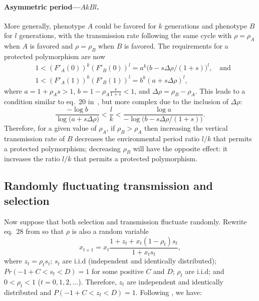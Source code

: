 \documentclass[14pt]{extarticle}
\begin{document}
\paragraph{Asymmetric period---$AkBl$.}
More generally, phenotype $A$ could be favored for $k$ generations and phenotype $B$ for $l$ generations, with the transmission rate following the same cycle with $\rho=\rho_A$ when $A$ is favored and $\rho=\rho_B$ when $B$ is favored.
The requirements for a protected polymorphism are now
\begin{equation}\begin{aligned}
& 1 < (F'_A(0))^k (F'_B(0))^l = a^k \big(b - s \Delta \rho /(1+s)\big)^l, \quad \text{and} \\
& 1 < (F'_A(1))^k (F'_B(1))^l = b^k (a + s \Delta \rho)^l,
\end{aligned}\end{equation}
where $a=1+\rho_A s>1$, $b=1-\rho_A\frac{s}{1+s}<1$, and $\Delta \rho = \rho_B - \rho_A$.
This leads to a condition similar to eq.~20 in~\citet{Ram2018}, but more complex due to the inclusion of $\Delta \rho$:
\begin{equation} \label{eq:poly_condition_periodic_fluc_k_l}
\frac{-\log{b}}{\log{\big(a + s \Delta \rho \big)}} < 
\frac{l}{k} < 
\frac{\log{a}}{-\log{\big(b - s \Delta \rho/(1+s)\big)}}.
\end{equation}
Therefore, for a given value of $\rho_A$, if $\rho_B>\rho_A$ then increasing the vertical transmission rate of $B$ decreases the environmental period ratio $l/k$ that permits a protected polymorphism; decreasing $\rho_B$  will have the opposite effect: it increases the ratio $l/k$ that permits a protected polymorphism.

\subsection*{Randomly fluctuating transmission and selection}

Now suppose that both selection and transmission fluctuate randomly.
Rewrite eq.~28 from \citet{Ram2018} so that $\rho$ is also a random variable
\begin{equation}
x_{t+1} = x_t \frac{1 + z_t + x_t (1 - \rho_t) s_t}{1 + x_t s_t},
\end{equation}
where $z_t=\rho_t s_t$; $s_t$ are i.i.d (independent and identically distributed); $Pr(-1+C<s_t<D)=1$ for some positive $C$ and $D$; $\rho_t$ are i.i.d; and  $0<\rho_t<1$ ($t=0,1,2,\ldots$).
Therefore, $z_t$ are independent and identically distributed and $P(-1+C < z_t < D)=1$.  Following \citet{Karlin1974}, we have:
\end{document}

